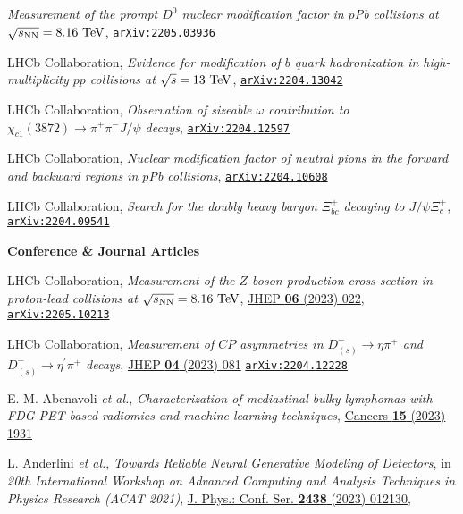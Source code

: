 \documentclass[a4paper, 11pt]{article}
\newenvironment{cvcontent}{
  \leftskip=0.5cm\rightskip=0cm
  \noindent\ignorespaces}{\par}
\newcommand{\journal}[1]{\textbf{\large #1}\\\vspace{-4mm}}
\newcommand{\arxiv}[1]{\href{https://arxiv.org/abs/#1}{\texttt{arXiv:#1}}}
\begin{document}
\begin{cvcontent}
\begin{enumerate}[label={[\arabic*]}, leftmargin=1.5cm]
    \emph{Measurement of the prompt $D^0$ nuclear modification factor in $p$Pb collisions at $\sqrt{s_{\rm{NN}}} = 8.16~{\rm{TeV}}$},
    \arxiv{2205.03936}
    \item LHCb Collaboration,
    \emph{Evidence for modification of $b$ quark hadronization in high-multiplicity $pp$ collisions at $\sqrt{s} = 13~\rm{TeV}$},
    \arxiv{2204.13042}
    \item LHCb Collaboration,
    \emph{Observation of sizeable $\omega$ contribution to $\chi_{c1}(3872) \to \pi^+ \pi^- J/\psi$ decays},
    \arxiv{2204.12597}
    \item LHCb Collaboration,
    \emph{Nuclear modification factor of neutral pions in the forward and backward regions in $p$Pb collisions},
    \arxiv{2204.10608}
    \sloppy
    \item LHCb Collaboration,
    \emph{Search for the doubly heavy baryon $\Xi_{bc}^{+}$ decaying to $J/\psi \Xi_{c}^{+}$},
    \arxiv{2204.09541}
  \end{enumerate}
  \vspace{3mm}
  \journal{Conference \& Journal Articles}
  \begin{enumerate}[label={[\arabic*]}, leftmargin=1.5cm]
    \item LHCb Collaboration,
    \emph{Measurement of the $Z$ boson production cross-section in proton-lead collisions at $\sqrt{s_{\rm{NN}}}=8.16~\rm{TeV}$},
    \href{https://doi.org/10.1007/JHEP06(2023)022}{JHEP \textbf{06} (2023) 022}, \arxiv{2205.10213}
    \item LHCb Collaboration,
    \emph{Measurement of $CP$ asymmetries in $D^+_{(s)}\rightarrow \eta \pi^+$ and $D^+_{(s)}\rightarrow \eta^{\prime} \pi^+$ decays},
    \href{https://doi.org/10.1007/JHEP04(2023)081}{JHEP \textbf{04} (2023) 081}
    \arxiv{2204.12228}
    \item E. M. Abenavoli \emph{et al.},
    \emph{Characterization of mediastinal bulky lymphomas with FDG-PET-based radiomics and machine learning techniques},
    \href{https://doi.org/10.3390/cancers15071931}{Cancers \textbf{15} (2023) 1931}
    \sloppy
    \item L. Anderlini \emph{et al.},
    \emph{Towards Reliable Neural Generative Modeling of Detectors},
    in \emph{20th International Workshop on Advanced Computing and Analysis Techniques in Physics Research (ACAT 2021)},
    \href{https://dx.doi.org/10.1088/1742-6596/2438/1/012130}{J. Phys.: Conf. Ser. \textbf{2438} (2023) 012130},

\end{enumerate}
\end{cvcontent}
\end{document}
